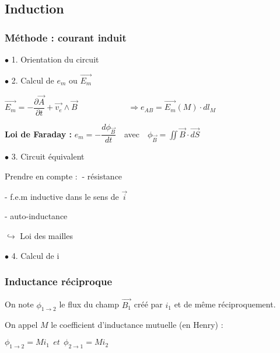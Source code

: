 \documentclass[9pt,twocolumn]{article}
\begin{document}
\setlength{\columnseprule}{0.1pt}
\begin{center}
\part*{Induction}
\end{center}
\section{Méthode : courant induit}


$\bullet$ 1. Orientation du circuit

$\bullet$ 2. Calcul de $e_{m}$ ou $\overrightarrow{E_{m}}$

\hspace{4mm}
   $\overrightarrow{E_{m}}=-\dfrac{\partial\overrightarrow{A}}{\partial t}+\overrightarrow{v_{e}}\wedge\overrightarrow{B}\>\>\>\>\>\>\>\>\>\>\>\>\>\>\>\>\>\>\>\>\>\>\>\>\>\>\>\> \Rightarrow e_{AB}=\displaystyle{\overrightarrow{E_{m}}(M)\cdot dl_{M}}$
   
 \hspace{4mm}  \textbf{Loi de Faraday :} $\boxed{e_{m}=-\dfrac{d \phi_{\overrightarrow{B}}}{dt}} \>\>\>$ avec $\>\>\> \displaystyle{\phi_{\overrightarrow{B}}=\iint \overrightarrow{B}\cdot\overrightarrow{dS}}$


$\bullet$ 3. Circuit équivalent

\hspace{4mm} Prendre en compte : $\>$- résistance 

\hspace{37mm} - f.e.m inductive dans le sens de $\overrightarrow{i}$ 

\hspace{37mm} - auto-inductance

\hspace{4mm} $\hookrightarrow$ Loi des mailles


$\bullet$ 4. Calcul de i


\section{Inductance réciproque}

On note $\phi_{1\rightarrow2}$ le flux du champ $\overrightarrow{B_{1}}$ créé par $i_{1}$ et de même réciproquement.

On appel $M$ le coefficient d'inductance mutuelle (en Henry) :

$\phi_{1\rightarrow2}=Mi_{1} \>\>et\>\> \phi_{2\rightarrow1}=Mi_{2}$
\end{document}
